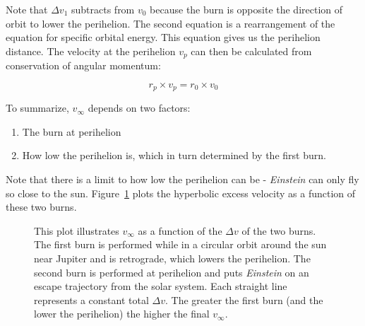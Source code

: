 \documentclass[12pt]{article} %
\begin{document}
Note that $\Delta v_1$ subtracts from $v_0$ because the burn is opposite the direction of orbit to lower the perihelion. The second equation is a rearrangement of the equation for specific orbital energy. This equation gives us the perihelion distance. The velocity at the perihelion $v_p$ can then be calculated from conservation of angular momentum:

$$r_p \times v_p = r_0 \times v_0$$

To summarize, $v_{\infty}$ depends on two factors: 

\begin{enumerate}
\item The burn at perihelion
\item How low the perihelion is, which in turn determined by the first burn. 
\end{enumerate}

Note that there is a limit to how low the perihelion can be - \textit{Einstein} can only fly so close to the sun. Figure~\ref{fig:TwoBurns} plots the hyperbolic excess velocity as a function of these two burns.

\begin{figure}[H]
\caption{This plot illustrates $v_{\infty}$ as a function of the $\Delta v$ of the two burns. The first burn is performed while in a circular orbit around the sun near Jupiter and is retrograde, which lowers the perihelion. The second burn is performed at perihelion and puts \textit{Einstein} on an escape trajectory from the solar system. Each straight line represents a constant total $\Delta v$. The greater the first burn (and the lower the perihelion) the higher the final $v_{\infty}$.}
\label{fig:TwoBurns}
\end{figure}
\end{document}
